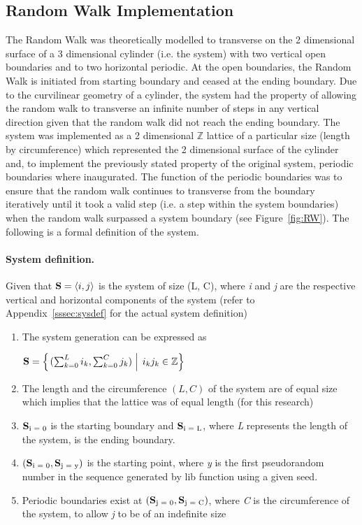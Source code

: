 \documentclass{article}
\DeclarePairedDelimiter{\opair}{\langle}{\rangle}
\begin{document}
\subsection{Random Walk Implementation}
	The Random Walk was theoretically modelled to transverse on the 2 dimensional surface of a 3 dimensional cylinder (i.e. the system) with two vertical open boundaries and to two horizontal periodic. At the open boundaries, the  Random Walk is initiated from starting boundary and ceased at the ending boundary. Due to the curvilinear geometry of a cylinder, the system had the property of allowing the random walk to transverse an infinite number of steps in any vertical direction given that the random walk did not reach the ending boundary. 
The system was implemented as a 2 dimensional $\mathbb{Z}$ lattice of a particular size (length by circumference) which represented the 2 dimensional surface of the cylinder and, to implement the previously stated property of the original system, periodic boundaries where inaugurated. The function of the periodic boundaries was to ensure that the random walk continues to transverse from the boundary iteratively until it took a valid step (i.e. a step within the system boundaries) when the random walk surpassed a system boundary (see Figure~\ref{fig:RW}). The following is a formal definition of the system.

\paragraph{System definition.}\label{subsec:sysfdef} Given that $\vb{S}=\opair{i, j}$ is the system of size (L, C), where \emph{i} and \emph{j} are the respective vertical and horizontal components of the system (refer to Appendix~\ref{sssec:sysdef} for the actual system definition)
	\begin{enumerate}
		\item The system generation can be expressed as
			\begin{center}
				$\vb{S} = \left\{\left. (\sum_{k=0}^L i_k,  \sum_{k=0}^C j_k) \; \right\vert \;i_k j_k \in\mathbb{Z} \right\}$
			\end{center}
		\item The length and the circumference $(L, C)$ of the system are of equal size which implies that the lattice was of equal length (for this research)
		\item $\vb{S}\textsubscript{i = 0}$ is the starting boundary and $\vb{S}\textsubscript{i = L}$, where \emph{L}  represents the length of the system, is the ending boundary. 
		\item $(\vb{S}\textsubscript{i = 0}, \vb{S}\textsubscript{j = y})$  is the starting point, where \emph{y} is the first pseudorandom number in the sequence generated by lib function using a given seed.
		\item Periodic boundaries exist at $(\vb{S}\textsubscript{j = 0}, \vb{S}\textsubscript{j = C})$, where \emph{C} is the circumference of the system, to allow \emph{j} to be of an indefinite size
	\end{enumerate}
\end{document}
